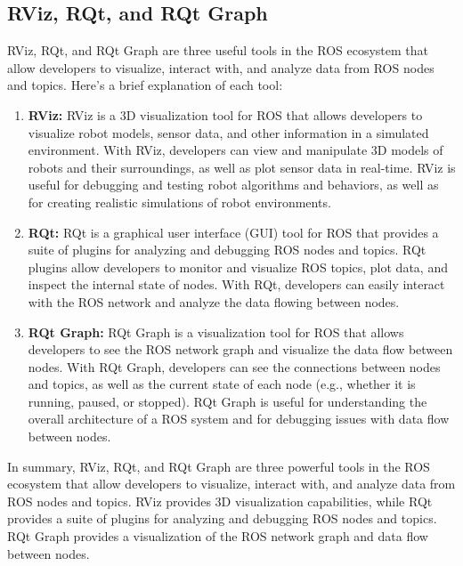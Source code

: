 \documentclass[12pt,oneside]{article}
\begin{document}
\subsection{RViz, RQt, and RQt Graph}\label{rviz_rqt}
RViz, RQt, and RQt Graph are three useful tools in the ROS ecosystem that allow developers to visualize, interact with, and analyze data from ROS nodes and topics. Here's a brief explanation of each tool:
\begin{enumerate}
\item \textbf{RViz:} RViz is a 3D visualization tool for ROS that allows developers to visualize robot models, sensor data, and other information in a simulated environment. With RViz, developers can view and manipulate 3D models of robots and their surroundings, as well as plot sensor data in real-time. RViz is useful for debugging and testing robot algorithms and behaviors, as well as for creating realistic simulations of robot environments.
\item \textbf{RQt:} RQt is a graphical user interface (GUI) tool for ROS that provides a suite of plugins for analyzing and debugging ROS nodes and topics. RQt plugins allow developers to monitor and visualize ROS topics, plot data, and inspect the internal state of nodes. With RQt, developers can easily interact with the ROS network and analyze the data flowing between nodes.
\item \textbf{RQt Graph: }RQt Graph is a visualization tool for ROS that allows developers to see the ROS network graph and visualize the data flow between nodes. With RQt Graph, developers can see the connections between nodes and topics, as well as the current state of each node (e.g., whether it is running, paused, or stopped). RQt Graph is useful for understanding the overall architecture of a ROS system and for debugging issues with data flow between nodes.
\end{enumerate}

In summary, RViz, RQt, and RQt Graph are three powerful tools in the ROS ecosystem that allow developers to visualize, interact with, and analyze data from ROS nodes and topics. RViz provides 3D visualization capabilities, while RQt provides a suite of plugins for analyzing and debugging ROS nodes and topics. RQt Graph provides a visualization of the ROS network graph and data flow between nodes.
\end{document}
